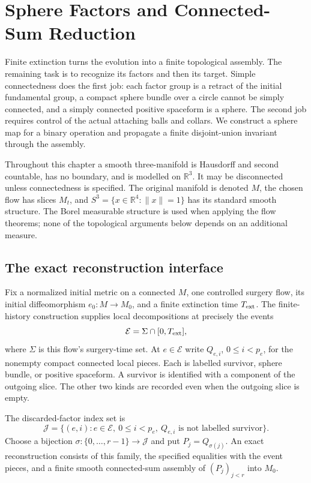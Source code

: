 \chapter{Sphere Factors and Connected-Sum Reduction}
\label{ch:sphere-reduction}

Finite extinction turns the evolution into a finite topological assembly.
The remaining task is to recognize its factors and then its target.  Simple
connectedness does the first job: each factor group is a retract of the
initial fundamental group, a compact sphere bundle over a circle cannot be
simply connected, and a simply connected positive spaceform is a sphere.
The second job requires control of the actual attaching balls and collars.
We construct a sphere map for a binary operation and propagate a finite
disjoint-union invariant through the assembly.

Throughout this chapter a smooth three-manifold is Hausdorff and second
countable, has no boundary, and is modelled on $\mathbb R^3$.
It may be disconnected unless connectedness is specified.  The original
manifold is denoted $M$, the chosen flow has slices $M_t$, and
$S^3=\{x\in\mathbb R^4:\|x\|=1\}$ has its standard smooth structure.
The Borel measurable structure is used when applying the flow theorems;
none of the topological arguments below depends on an additional measure.

\section{The exact reconstruction interface}
\label{sec:sphere-reconstruction-interface}

Fix a normalized initial metric on a connected $M$, one controlled surgery
flow, its initial diffeomorphism $e_0:M\to M_0$, and a finite extinction
time $T_{\rm ext}$.  The finite-history construction supplies local
decompositions at precisely the events
\[
 \mathcal E=\Sigma\cap[0,T_{\rm ext}],
\]
where $\Sigma$ is this flow's surgery-time set.  At $e\in\mathcal E$ write
$Q_{e,i}$, $0\le i<p_e$, for the nonempty compact connected local pieces.
Each is labelled survivor, sphere bundle, or positive spaceform.  A survivor
is identified with a component of the outgoing slice.  The other two kinds
are recorded even when the outgoing slice is empty.

\begin{definition}
\label{def:exact-factor-ledger}
The discarded-factor index set is
\[
 \mathcal J=\{(e,i):e\in\mathcal E,\ 0\le i<p_e,\
                       Q_{e,i}\text{ is not labelled survivor}\}.
\]
Choose a bijection $\sigma:\{0,\ldots,r-1\}\to\mathcal J$ and put
$P_j=Q_{\sigma(j)}$.  An exact reconstruction consists of this family,
the specified equalities with the event pieces, and a finite smooth
connected-sum assembly of $(P_j)_{j<r}$ into $M_0$.
\end{definition}

